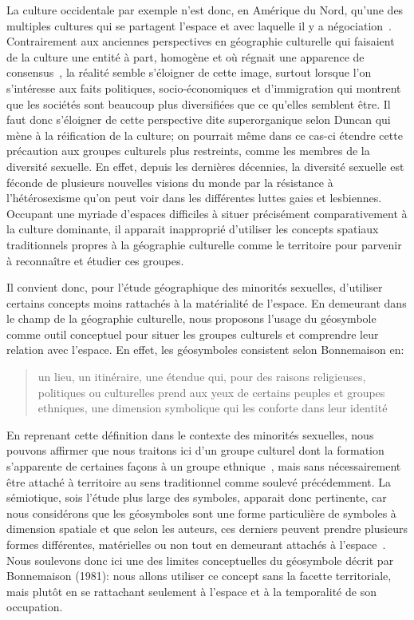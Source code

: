 La culture occidentale par exemple n'est donc, en Amérique du Nord, qu'une des multiples cultures qui se partagent l'espace et avec laquelle il y a négociation~\citep[11]{Duncan1993}. 
Contrairement aux anciennes perspectives en géographie culturelle qui faisaient de la culture une entité à part, homogène et où régnait une apparence de consensus~\citep{Duncan1980}, la réalité semble s'éloigner de cette image, surtout lorsque l'on s'intéresse aux faits politiques, socio-économiques et d'immigration qui montrent que les sociétés sont beaucoup plus diversifiées que ce qu'elles semblent être. 
Il faut donc s'éloigner de cette perspective dite superorganique selon Duncan qui mène à la réification de la culture; on pourrait même dans ce cas-ci étendre cette précaution aux groupes culturels plus restreints, comme les membres de la diversité sexuelle. 
En effet, depuis les dernières décennies, la diversité sexuelle est féconde de plusieurs nouvelles visions du monde par la résistance à l'hétérosexisme qu'on peut voir dans les différentes luttes gaies et lesbiennes.
Occupant une myriade d'espaces difficiles à situer précisément comparativement à la culture dominante, il apparait inapproprié d'utiliser les concepts spatiaux traditionnels propres à la géographie culturelle comme le territoire pour parvenir à reconnaître et étudier ces groupes.

Il convient donc, pour l'étude géographique des minorités sexuelles, d'utiliser certains concepts moins rattachés à la matérialité de l'espace. 
En demeurant dans le champ de la géographie culturelle, nous proposons l'usage du géosymbole comme outil conceptuel pour situer les groupes culturels et comprendre leur relation avec l'espace. 
En effet, les géosymboles consistent selon Bonnemaison en: \blockquote[{\cite[256]{Bonnemaison1981}}][.]{\textelp{} un lieu, un   itinéraire, une étendue qui, pour des raisons religieuses, politiques ou   culturelles prend aux yeux de certains peuples et groupes ethniques, une   dimension symbolique qui les conforte dans leur identité }. 
En reprenant cette définition dans le contexte des minorités sexuelles, nous pouvons affirmer que nous traitons ici d'un groupe culturel dont la formation s'apparente de certaines façons à un groupe ethnique~\citep{Sinfield1996}, mais sans nécessairement être attaché à territoire au sens traditionnel comme soulevé précédemment. 
La sémiotique, sois l'étude plus large des symboles, apparait donc pertinente, car nous considérons que les géosymboles sont une forme particulière de symboles à dimension spatiale et que selon les auteurs, ces derniers peuvent prendre plusieurs formes différentes, matérielles ou non tout en demeurant attachés à l'espace~\citep{Bonnemaison1981,Bedard2002}. 
Nous soulevons donc ici une des limites conceptuelles du géosymbole décrit par Bonnemaison (1981): nous allons utiliser ce concept sans la facette territoriale, mais plutôt en se rattachant seulement à l'espace et à la temporalité de son occupation.

